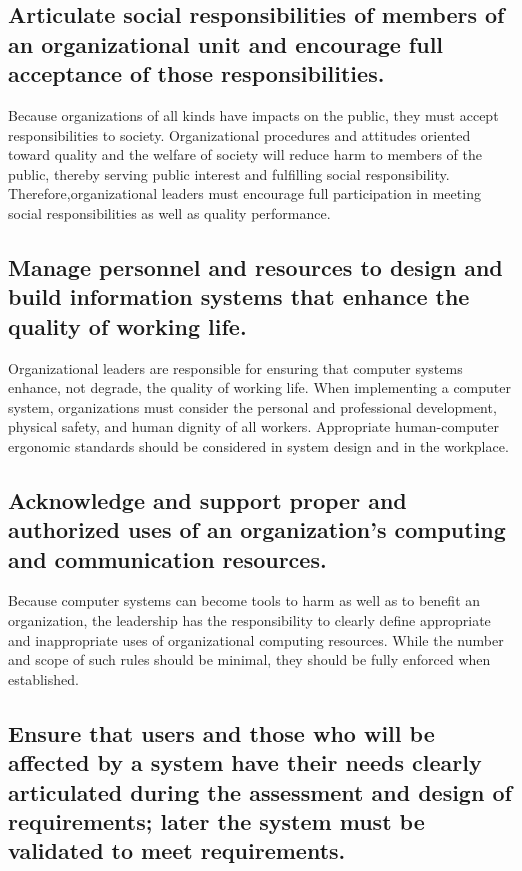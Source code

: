 \documentclass{article}
\begin{document}
\subsection{Articulate social responsibilities of members of an organizational
unit and encourage full acceptance of those responsibilities.}

Because organizations of all kinds have impacts on the public, they must accept
responsibilities to society. Organizational procedures and attitudes oriented
toward quality and the welfare of society will reduce harm to members of the
public, thereby serving public interest and fulfilling social responsibility.
Therefore,organizational leaders must encourage full participation in meeting
social responsibilities as well as quality performance.

\subsection{Manage personnel and resources to design and build information
systems that enhance the quality of working life.}

Organizational leaders are responsible for ensuring that computer systems
enhance, not degrade, the quality of working life. When implementing a computer
system, organizations must consider the personal and professional development,
physical safety, and human dignity of all workers. Appropriate human-computer
ergonomic standards should be considered in system design and in the workplace.

\subsection{Acknowledge and support proper and authorized uses of an
organization's computing and communication resources.}

Because computer systems can become tools to harm as well as to benefit an
organization, the leadership has the responsibility to clearly define
appropriate and inappropriate uses of organizational computing resources. While
the number and scope of such rules should be minimal, they should be fully
enforced when established.

\subsection{Ensure that users and those who will be affected by a system have
their needs clearly articulated during the assessment and design of
requirements; later the system must be validated to meet requirements.}
\end{document}
